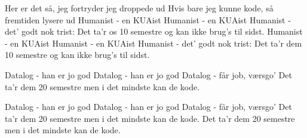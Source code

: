 \documentclass[a4paper,11pt]{article}
\begin{document}
\begin{song}
{        Her er det så, jeg fortryder jeg droppede ud
        Hvis bare jeg kunne kode, så fremtiden lysere ud
    }
     {
        Humanist - en KUAist
        Humanist - en KUAist
        Humanist - det’ godt nok trist:
        Det ta’r os 10 semestre
        og kan ikke brug’s til sidst.
    }
     {
        Humanist - en KUAist
        Humanist - en KUAist
        Humanist - det’ godt nok trist:
        Det ta’r dem 10 semestre
        og kan ikke brug’s til sidst.
    }
%


     {
        Datalog - han er jo god
        Datalog - han er jo god
        Datalog - får job, værsgo’
        Det ta’r dem 20 semestre
        men i det mindste kan de kode.
    }

     {
        Datalog - han er jo god
        Datalog - han er jo god
        Datalog - får job, værsgo’
        Det ta’r dem 20 semestre
        men i det mindste kan de kode.
        Det ta’r dem 20 semestre
        men i det mindste kan de kode.
    }
\end{song}
\end{document}
